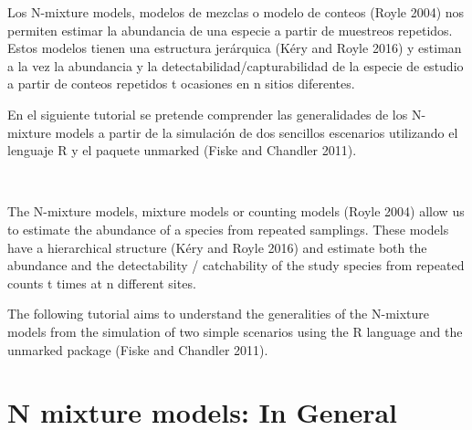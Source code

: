 \documentclass[
]{book}
\begin{document}
\begin{col}{0.45\textwidth}
Los N-mixture models, modelos de mezclas o modelo de conteos (Royle 2004) nos permiten estimar la abundancia de una especie a partir de muestreos repetidos. Estos modelos tienen una estructura jerárquica (Kéry and Royle 2016) y estiman a la vez la abundancia y la detectabilidad/capturabilidad de la especie de estudio a partir de conteos repetidos t ocasiones en n sitios diferentes.

En el siguiente tutorial se pretende comprender las generalidades de los N-mixture models a partir de la simulación de dos sencillos escenarios utilizando el lenguaje R y el paquete unmarked (Fiske and Chandler 2011).

\end{col}

\begin{col}{0.05\textwidth}
~

\end{col}

\begin{col}{0.45\textwidth}
The N-mixture models, mixture models or counting models (Royle 2004) allow us to estimate the abundance of a species from repeated samplings. These models have a hierarchical structure (Kéry and Royle 2016) and estimate both the abundance and the detectability / catchability of the study species from repeated counts t times at n different sites.

The following tutorial aims to understand the generalities of the N-mixture models from the simulation of two simple scenarios using the R language and the unmarked package (Fiske and Chandler 2011).

\end{col}

\hypertarget{gen}{%
\chapter{N mixture models: In General}\label{gen}}
\end{document}
